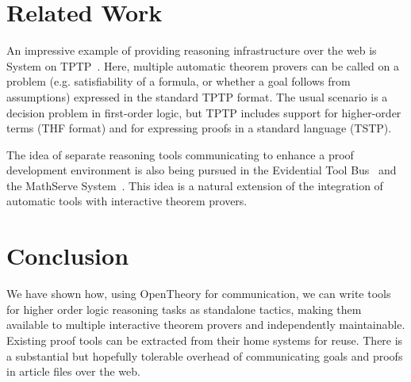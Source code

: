 \documentclass{llncs}
\newcommand{\OpenTheory}{OpenTheory\xspace}
\newcommand{\eg}{e.g.\xspace}
\begin{document}



\section{Related Work}

An impressive example of providing reasoning infrastructure over the web is System on TPTP~\cite{DBLP:conf/lpar/Sutcliffe10}.
Here, multiple automatic theorem provers can be called on a problem (\eg satisfiability of a formula, or whether a goal follows from assumptions) expressed in the standard TPTP format.
The usual scenario is a decision problem in first-order logic, but TPTP includes support for higher-order terms (THF format) and for expressing proofs in a standard language (TSTP).

The idea of separate reasoning tools communicating to enhance a proof development environment is also being pursued in the Evidential Tool Bus~\cite{DBLP:conf/icfem/Rushby05} and the MathServe System~\cite{DBLP:conf/cade/ZimmerA06}.
This idea is a natural extension of the integration of automatic tools with interactive theorem provers.

\section{Conclusion}

We have shown how, using \OpenTheory for communication, we can write tools for higher order logic reasoning tasks as standalone tactics, making them available to multiple interactive theorem provers and independently maintainable.
Existing proof tools can be extracted from their home systems for reuse.
There is a substantial but hopefully tolerable overhead of communicating goals and proofs in article files over the web.



\end{document}
